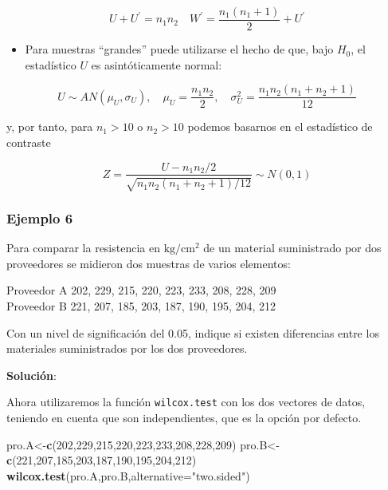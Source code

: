 \documentclass[
]{article}
\newenvironment{Shaded}{\begin{snugshade}}{\end{snugshade}}
\newcommand{\AttributeTok}[1]{\textcolor[rgb]{0.13,0.29,0.53}{#1}}
\newcommand{\DecValTok}[1]{\textcolor[rgb]{0.00,0.00,0.81}{#1}}
\newcommand{\FunctionTok}[1]{\textcolor[rgb]{0.13,0.29,0.53}{\textbf{#1}}}
\newcommand{\NormalTok}[1]{#1}
\newcommand{\OtherTok}[1]{\textcolor[rgb]{0.56,0.35,0.01}{#1}}
\newcommand{\StringTok}[1]{\textcolor[rgb]{0.31,0.60,0.02}{#1}}
\providecommand{\tightlist}{%
  \setlength{\itemsep}{0pt}\setlength{\parskip}{0pt}}
\begin{document}
\[
U+U^{\prime}=n_{1} n_{2} \quad W^{\prime}=\frac{n_{1}\left(n_{1}+1\right)}{2}+U^{\prime}
\]

\begin{itemize}
\tightlist
\item
  Para muestras ``grandes'' puede utilizarse el hecho de que, bajo \(H_{0}\), el estadístico \(U\) es asintóticamente normal:
\end{itemize}

\[
U \sim A N\left(\mu_{U}, \sigma_{U}\right), \quad \mu_{U}=\frac{n_{1} n_{2}}{2}, \quad \sigma_{U}^{2}=\frac{n_{1} n_{2}\left(n_{1}+n_{2}+1\right)}{12}
\]

y, por tanto, para \(n_{1}>10\) o \(n_{2}>10\) podemos basarnos en el estadístico de contraste

\[
Z=\frac{U-n_{1} n_{2} / 2}{\sqrt{n_{1} n_{2}\left(n_{1}+n_{2}+1\right) / 12}} \sim N(0,1)
\]

\subsubsection{Ejemplo 6}\label{ejemplo-6-1}

Para comparar la resistencia en \(\mathrm{kg} / \mathrm{cm}^{2}\) de un material suministrado por dos proveedores se midieron dos muestras de varios elementos:

Proveedor A 202, 229, 215, 220, 223, 233, 208, 228, 209\\
Proveedor B 221, 207, 185, 203, 187, 190, 195, 204, 212

Con un nivel de significación del 0.05, indique si existen diferencias entre los materiales suministrados por los dos proveedores.

\textbf{Solución}:

Ahora utilizaremos la función \texttt{wilcox.test} con los dos vectores de datos, teniendo en cuenta que son independientes, que es la opción por defecto.

\begin{Shaded}
\begin{Highlighting}[]
\NormalTok{pro.A}\OtherTok{\textless{}{-}}\FunctionTok{c}\NormalTok{(}\DecValTok{202}\NormalTok{,}\DecValTok{229}\NormalTok{,}\DecValTok{215}\NormalTok{,}\DecValTok{220}\NormalTok{,}\DecValTok{223}\NormalTok{,}\DecValTok{233}\NormalTok{,}\DecValTok{208}\NormalTok{,}\DecValTok{228}\NormalTok{,}\DecValTok{209}\NormalTok{)}
\NormalTok{pro.B}\OtherTok{\textless{}{-}}\FunctionTok{c}\NormalTok{(}\DecValTok{221}\NormalTok{,}\DecValTok{207}\NormalTok{,}\DecValTok{185}\NormalTok{,}\DecValTok{203}\NormalTok{,}\DecValTok{187}\NormalTok{,}\DecValTok{190}\NormalTok{,}\DecValTok{195}\NormalTok{,}\DecValTok{204}\NormalTok{,}\DecValTok{212}\NormalTok{)}
\FunctionTok{wilcox.test}\NormalTok{(pro.A,pro.B,}\AttributeTok{alternative=}\StringTok{"two.sided"}\NormalTok{)}
\end{Highlighting}
\end{Shaded}
\end{document}
